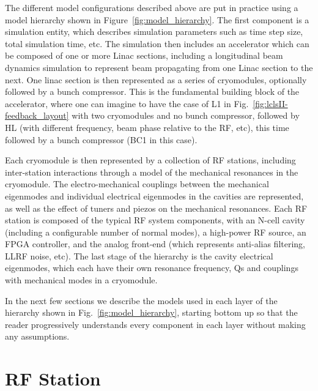 \documentclass[a4paper,12pt]{article}
\begin{document}
The different model configurations described above are put in practice using a model hierarchy shown in Figure~\ref{fig:model_hierarchy}. The first component is a simulation entity, which describes simulation parameters such as time step size, total simulation time, etc. The simulation then includes an accelerator which can be composed of one or more Linac sections, including a longitudinal beam dynamics simulation to represent beam propagating from one Linac section to the next. One linac section is then represented as a series of cryomodules, optionally followed by a bunch compressor. This is the fundamental building block of the accelerator, where one can imagine to have the case of L1 in Fig.~\ref{fig:lclsII-feedback_layout} with two cryomodules and no bunch compressor, followed by HL (with different frequency, beam phase relative to the RF, etc), this time followed by a bunch compressor (BC1 in this case).

Each cryomodule is then represented by a collection of RF stations, including inter-station interactions through a model of the mechanical resonances in the cryomodule. The electro-mechanical couplings between the mechanical eigenmodes and individual electrical eigenmodes in the cavities are represented, as well as the effect of tuners and piezos on the mechanical resonances. Each RF station is composed of the typical RF system components, with an N-cell cavity (including a configurable number of normal modes), a high-power RF source, an FPGA controller, and the analog front-end (which represents anti-alias filtering, LLRF noise, etc). The last stage of the hierarchy is the cavity electrical eigenmodes, which each have their own resonance frequency, Qs and couplings with mechanical modes in a cryomodule.

In the next few sections we describe the models used in each layer of the hierarchy shown in Fig.~\ref{fig:model_hierarchy}, starting bottom up so that the reader progressively understands every component in each layer without making any assumptions.

\newpage

\section{RF Station}
\label{sec:rf_station}
\end{document}
